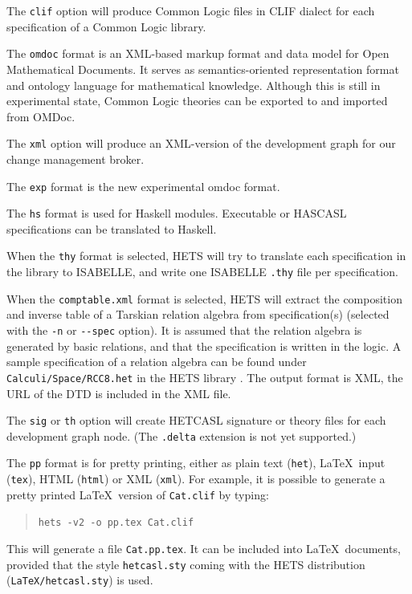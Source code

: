 \documentclass{article}
\newcommand{\normalTEXTSC}[2]{{#1\scriptsize#2}}
\newcommand     {\Hets}{\normalTEXTSC{H}{ETS}\xspace}
\newcommand     {\Isabelle}{\normalTEXTSC{I}{SABELLE}\xspace}
\newcommand     {\HasCASL}{\normalTEXTSC{H}{AS}\normalTEXTSC{C}{ASL}\xspace}
\newcommand{\HetCASL}{\normalTEXTSC{H}{ET}\normalTEXTSC{C}{ASL}\xspace}
\begin{document}
\begin{description}
The \texttt{clif} option will produce Common Logic files in
CLIF dialect for each specification of a Common Logic library.

The \texttt{omdoc} format \cite{books/sp/Kohlhase06} is an XML-based
markup format and data model for Open Mathematical Documents. It
serves as semantics-oriented representation format and ontology
language for mathematical knowledge. Although this is still in experimental 
state, Common Logic theories can be exported to and imported from OMDoc.

The \texttt{xml} option will produce an XML-version of the development graph
for our change management broker.

The \texttt{exp} format is the new experimental omdoc format.

The \texttt{hs} format is used for Haskell modules. Executable \CASL or
\HasCASL specifications can be translated to Haskell.

When the \texttt{thy} format is selected, \Hets will try to translate
each specification in the library to \Isabelle, and write one \Isabelle
\texttt{.thy} file per specification.

When the \texttt{comptable.xml} format is selected, \Hets will extract
the composition and inverse table of a Tarskian relation algebra from
specification(s) (selected with the \texttt{-n} or \texttt{-{}-spec}
option). It is assumed that the relation algebra is
generated by basic relations, and that the specification is written
in the \CASL logic. A sample specification of a relation
algebra can be found under \texttt{Calculi/Space/RCC8.het} in the \Hets library \cite{hets-library:URL}.
The output format is XML, the URL of the DTD is included in the
XML file.

The \texttt{sig} or \texttt{th} option will create \HetCASL signature or
theory files for each development graph node. (The \texttt{.delta} extension
is not yet supported.)

The \texttt{pp} format is for pretty printing, either as plain text
(\texttt{het}), \LaTeX\ input (\texttt{tex}), HTML (\texttt{html}) or XML
(\texttt{xml}).  For example, it is possible to generate a pretty printed
\LaTeX\ version of \texttt{Cat.clif} by typing:

\begin{quote}
\texttt{hets -v2 -o pp.tex Cat.clif}
\end{quote}

This will generate a file \texttt{Cat.pp.tex}. It can be included
into \LaTeX\ documents, provided that the style \texttt{hetcasl.sty}
coming with the \Hets distribution (\texttt{LaTeX/hetcasl.sty}) is used.


\end{description}
\end{document}
